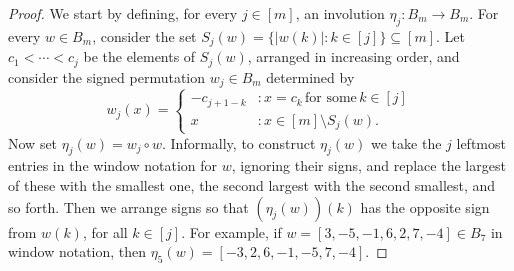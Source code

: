 \documentclass[11pt,a4paper]{amsart}
\theoremstyle{plain}
\theoremstyle{remark}
\begin{document}
\begin{proof}
We start by defining, for every $j \in [m]$, an involution $\eta_j : B_m \to B_m$.  For every $w \in B_m$, consider the set $S_j(w) = \{ |w(k)| : k \in [j] \} \subseteq [m]$.  Let $c_1 < \cdots < c_j$ be the elements of $S_j(w)$, arranged in increasing order, and consider the signed permutation $w_j \in B_m$ determined by
\begin{equation*}
w_j(x) = \begin{cases}
- c_{j+1-k} &: x = c_k \, \text{for some} \, k \in [j] \\
x &: x \in [m] \setminus S_j(w). \end{cases}
\end{equation*}
Now set $\eta_j (w) = w_j \circ w$.  Informally, to construct $\eta_j(w)$ we take the $j$ leftmost entries in the window notation for $w$, ignoring their signs, and replace the largest of these with the smallest one, the second largest with the second smallest, and so forth.  Then we arrange signs so that $(\eta_j(w))(k)$ has the opposite sign from $w(k)$, for all $k \in [j]$.
For example, if $w = [3, -5, -1, 6, 2, 7, -4] \in B_7$ in window notation, then $\eta_5(w) = [-3, 2, 6, -1, -5, 7, -4]$.


\end{proof}
\end{document}

